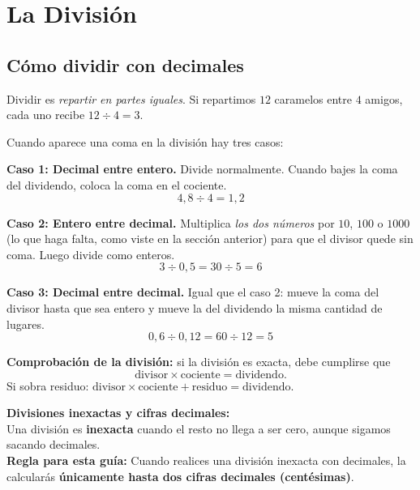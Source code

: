 \documentclass[12pt, letterpaper]{article}
\begin{document}
\section{La División}

\subsection{Cómo dividir con decimales}

Dividir es \emph{repartir en partes iguales}. Si repartimos $12$ caramelos entre $4$ amigos, cada uno recibe $12 \div 4 = 3$.

Cuando aparece una coma en la división hay tres casos:

\begin{cuadroteoria}
  \textbf{Caso 1: Decimal entre entero.} Divide normalmente. Cuando bajes la coma del dividendo, coloca la coma en el cociente.
  \[
    4{,}8 \div 4 = 1{,}2
  \]

  \textbf{Caso 2: Entero entre decimal.} Multiplica \emph{los dos números} por $10$, $100$ o $1000$ (lo que haga falta, como viste en la sección anterior) para que el divisor quede sin coma. Luego divide como enteros.
  \[
    3 \div 0{,}5 = 30 \div 5 = 6
  \]

  \textbf{Caso 3: Decimal entre decimal.} Igual que el caso 2: mueve la coma del divisor hasta que sea entero y mueve la del dividendo la misma cantidad de lugares.
  \[
    0{,}6 \div 0{,}12 = 60 \div 12 = 5
  \]
\end{cuadroteoria}
\newpage
\begin{cuadrosolucion}
  \textbf{Comprobación de la división:} si la división es exacta, debe cumplirse que
  \[
    \text{divisor} \times \text{cociente} = \text{dividendo}.
  \]
  Si sobra residuo: $\text{divisor} \times \text{cociente} + \text{residuo} = \text{dividendo}$.
\end{cuadrosolucion}

\begin{cuadroadvertencia}
  \textbf{Divisiones inexactas y cifras decimales:} \\
  Una división es \textbf{inexacta} cuando el resto no llega a ser cero, aunque sigamos sacando decimales. \\
  \textbf{Regla para esta guía:} Cuando realices una división inexacta con decimales, la calcularás \textbf{únicamente hasta dos cifras decimales (centésimas)}.
\end{cuadroadvertencia}
\end{document}
